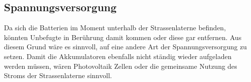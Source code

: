 \subsection{Spannungsversorgung}
Da sich die Batterien im Moment unterhalb der Strassenlaterne befinden, könnten Unbefugte in Berührung damit kommen oder diese gar entfernen. Aus diesem Grund wäre es sinnvoll, auf eine andere Art der Spannungsversorgung zu setzen. Damit die Akkumulatoren ebenfalls nicht ständig wieder aufgeladen werden müssen, wären Photovoltaik Zellen oder die gemeinsame Nutzung des Stroms der Strassenlaterne sinnvoll.